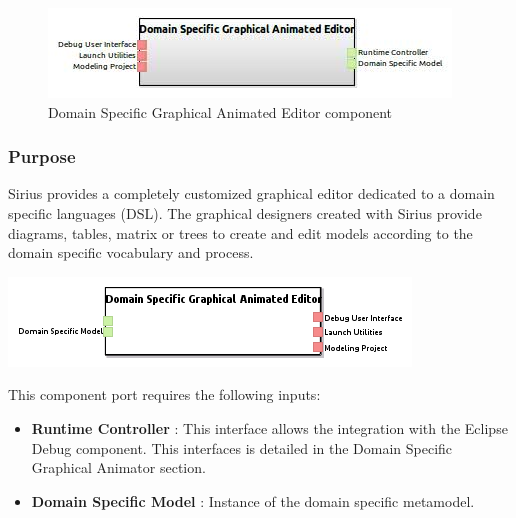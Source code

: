 \documentclass{gemoc} %
\begin{document}
\begin{figure}[htp]
	\begin{center}
	\includegraphics*[trim=0.0cm 0.0cm 0cm 0.0cm, clip=true, scale=1.0]{../images/generated/Generated_Domain Specific Graphical Animated Editor.jpg}
	\caption{Domain Specific Graphical Animated Editor component}
	\end{center}
\end{figure}

\subsubsection{Purpose}
Sirius provides a completely customized graphical editor dedicated to a domain specific languages (DSL). The graphical designers created with Sirius
provide diagrams, tables, matrix or trees to create and edit models according to the domain specific vocabulary and process.
\begin{center}
\includegraphics*[trim=0.0cm 0.0cm 0cm 0.0cm, clip=true]{../images/generated/Generated_Domain_Specific_Graphical_Animated_Editor.png}
\end{center}

This component port requires the following inputs:
\begin{itemize}
  \item \textbf{Runtime Controller} :
This interface allows the integration with the Eclipse Debug component. This interfaces is detailed in the Domain Specific Graphical Animator section.
  \item \textbf{Domain Specific Model} :
Instance of the domain specific metamodel.
\end{itemize}
\end{document}
